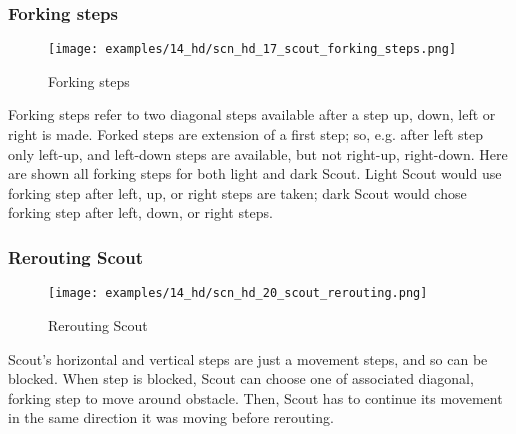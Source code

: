 \vspace*{-0.7\baselineskip}
\subsubsection*{Forking steps}
\label{sec:Hemera's Dawn/Scout/Movement/Forking steps}

\vspace*{-0.7\baselineskip}
\noindent
\begin{wrapfigure}[11]{l}{0.4\textwidth}
\centering
\texttt{[image: examples/14\_hd/scn\_hd\_17\_scout\_forking\_steps.png]}
\vspace*{-0.3\baselineskip}
\caption{Forking steps}
\label{fig:scn_hd_17_scout_forking_steps}
\end{wrapfigure}
Forking steps refer to two diagonal steps available after a step up, down, left
or right is made. \newline
\indent
Forked steps are extension of a first step; so, e.g. after left step only left-up,
and left-down steps are available, but not right-up, right-down. \newline
\indent
Here are shown all forking steps for both light and dark Scout. Light Scout would
use forking step after left, up, or right steps are taken; dark Scout would chose
forking step after left, down, or right steps.

\clearpage %

\subsubsection*{Rerouting Scout}
\label{sec:Hemera's Dawn/Scout/Movement/Rerouting Scout}

\vspace*{-0.7\baselineskip}
\noindent
\begin{wrapfigure}[9]{l}{0.41\textwidth}
\centering
\texttt{[image: examples/14\_hd/scn\_hd\_20\_scout\_rerouting.png]}
\vspace*{-0.3\baselineskip}
\caption{Rerouting Scout}
\label{fig:scn_hd_20_scout_rerouting}
\end{wrapfigure}
Scout's horizontal and vertical steps are just a movement steps, and so can be blocked.
When step is blocked, Scout can choose one of associated diagonal, forking step to
move around obstacle. Then, Scout has to continue its movement in the same direction
it was moving before rerouting.

